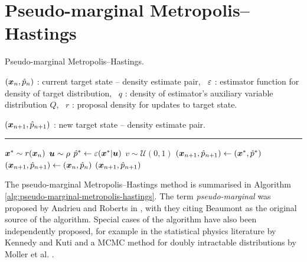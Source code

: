 \section{Pseudo-marginal Metropolis--Hastings}

\begin{algorithm}[!t]
\caption{Pseudo-marginal Metropolis--Hastings.}
\label{alg:pseudo-marginal-metropolis-hastings}
\begin{algorithmic}
\small
    \Require
    $(\boldsymbol{x}_n, \hat{p}_n)$ : current target state -- density estimate pair,~
    $\varepsilon$ : estimator function for density of target distribution,~
    $q$ : density of estimator's auxiliary variable distribution $Q$,~
    $r$ : proposal density for updates to target state.
    \Ensure\raggedright
    $(\boldsymbol{x}_{n+1}, \hat{p}_{n+1})$ : new target state -- density estimate pair.
\end{algorithmic}
\hrule
\small
\begin{algorithmic}[1]
  \State $\boldsymbol{x}^* \sim r(\boldsymbol{x}_n)$ 
  \State $\boldsymbol{u} \sim \rho$\label{ln:density-estimate-1}
  \State $\hat{p}^* \gets \varepsilon(\boldsymbol{x}^*|\boldsymbol{u})$ \label{ln:density-estimate-2} 
  \State $v \sim \mathcal{U}(0,1)$
    \State $(\boldsymbol{x}_{n+1},\hat{p}_{n+1}) \gets (\boldsymbol{x}^*,\hat{p}^*)$ 
  \Else
    \State  $ (\boldsymbol{x}_{n+1},\hat{p}_{n+1}) \gets (\boldsymbol{x}_n,\hat{p}_n)$ 
  \EndIf
  \State \Return $(\boldsymbol{x}_{n+1},\hat{p}_{n+1})$
\end{algorithmic}
\end{algorithm}

The pseudo-marginal Metropolis--Hastings method is summarised in Algorithm \ref{alg:pseudo-marginal-metropolis-hastings}. The term \emph{pseudo-marginal} was proposed by Andrieu and Roberts in \citep{andrieu2009pseudo}, with they citing Beaumont \citep{beaumont2003estimation} as the original source of the algorithm. Special cases of the algorithm have also been independently proposed, for example in the statistical physics literature by Kennedy and Kuti \citep{kennedy1985noise} and a \ac{MCMC} method for doubly intractable distributions by Moller et al. \citep{moller2006efficient}.

